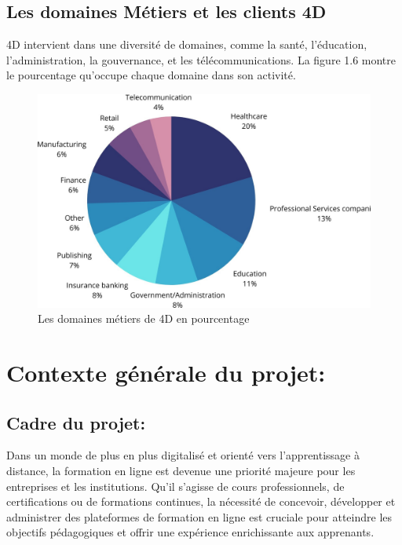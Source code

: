 \subsection{Les domaines Métiers et les clients 4D}
4D intervient dans une diversité de domaines, comme 
la santé, l’éducation, l’administration, la gouvernance, 
et les télécommunications. La figure 1.6 montre le pourcentage 
qu’occupe chaque domaine dans son activité.

\begin{figure}[h]
    \centering
    \includegraphics[scale=0.3]{Figures/domaineMetier.jpg} %
    \caption{Les domaines métiers de 4D en pourcentage}
    \label{fig:domaineMetier}
\end{figure}



\section{Contexte générale du projet:}

\subsection{Cadre du projet:}

Dans un monde de plus en plus digitalisé et orienté 
vers l'apprentissage à distance, la formation en ligne est 
devenue une priorité majeure pour les entreprises et 
les institutions. Qu'il s'agisse de cours professionnels,
 de certifications ou de formations continues, la nécessité de concevoir, développer et administrer des plateformes de formation en ligne est cruciale pour atteindre les objectifs pédagogiques et offrir une expérience enrichissante aux apprenants.
 
